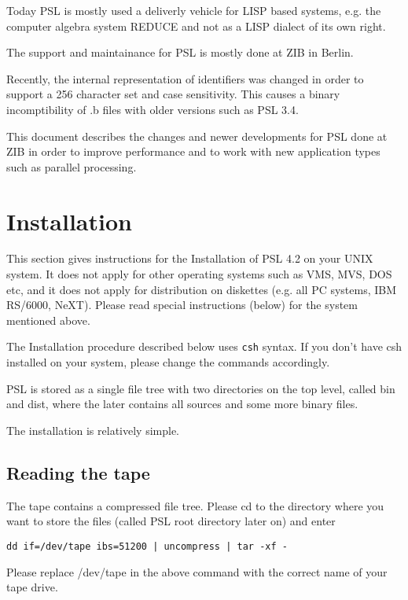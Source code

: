 Today PSL is mostly used a deliverly vehicle for LISP based systems, e.g.
the computer algebra system REDUCE and not as a LISP dialect of its own 
right.

The support and maintainance for PSL is mostly done at ZIB in Berlin.

Recently, the internal representation of identifiers was changed in order
to support a 256 character set and case sensitivity. This causes a
binary incomptibility of .b files with older versions such as PSL 3.4.

This document describes the changes and newer developments for PSL
done at ZIB in order to improve performance and to work with new
application types such as parallel processing.

\section{Installation}

This section gives instructions for the Installation of PSL 4.2 on
your UNIX system. It does not apply for other operating systems such
as VMS, MVS, DOS etc, and it does not apply for distribution on
diskettes (e.g. all PC systems, IBM RS/6000, NeXT). Please read
special instructions (below) for the system mentioned above.

The Installation procedure described below uses {\tt csh} syntax.
If you don't have csh installed on your system, please change the
commands accordingly.

PSL is stored as a single file tree with two directories on the
top level, called bin and dist, where the later contains all sources
and some more binary files.

The installation is relatively simple.

\subsection{Reading the tape}

The tape contains a compressed file tree. Please cd to the directory
where you want to store the files (called PSL root directory later on)
and enter 

\begin{verbatim}
dd if=/dev/tape ibs=51200 | uncompress | tar -xf -
\end{verbatim}

Please replace /dev/tape in the above command with the correct
name of your tape drive.

